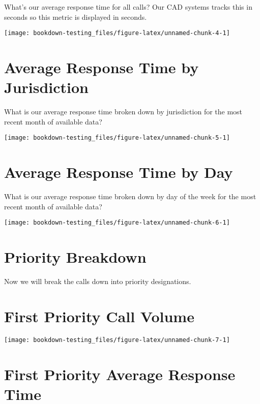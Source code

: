 \documentclass[]{book}
\begin{document}
What's our average response time for all calls? Our CAD systems tracks this in seconds so this metric is displayed in seconds.

\texttt{[image: bookdown-testing\_files/figure-latex/unnamed-chunk-4-1]}

\hypertarget{average-response-time-by-jurisdiction}{%
\section{Average Response Time by Jurisdiction}\label{average-response-time-by-jurisdiction}}

What is our average response time broken down by jurisdiction for the most recent month of available data?

\texttt{[image: bookdown-testing\_files/figure-latex/unnamed-chunk-5-1]}

\hypertarget{average-response-time-by-day}{%
\section{Average Response Time by Day}\label{average-response-time-by-day}}

What is our average response time broken down by day of the week for the most recent month of available data?

\texttt{[image: bookdown-testing\_files/figure-latex/unnamed-chunk-6-1]}

\hypertarget{priority-breakdown}{%
\section*{Priority Breakdown}\label{priority-breakdown}}

Now we will break the calls down into priority designations.

\hypertarget{first-priority-call-volume}{%
\section{First Priority Call Volume}\label{first-priority-call-volume}}

\texttt{[image: bookdown-testing\_files/figure-latex/unnamed-chunk-7-1]}

\hypertarget{first-priority-average-response-time}{%
\section{First Priority Average Response Time}\label{first-priority-average-response-time}}
\end{document}
